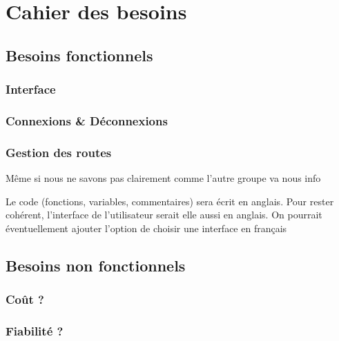 \chapter{Cahier des besoins}

\section{Besoins fonctionnels}

\subsection{Interface}
\subsection{Connexions \& Déconnexions}
\subsection{Gestion des routes}


Même si nous ne savons pas clairement comme l'autre groupe va nous info

Le code (fonctions, variables, commentaires) sera écrit en anglais.\newline
Pour rester cohérent, l'interface de l'utilisateur serait elle aussi en anglais.\newline
On pourrait éventuellement ajouter l'option de choisir une interface en français



\section{Besoins non fonctionnels}

\subsection{Coût ?}

\subsection{Fiabilité ?}

